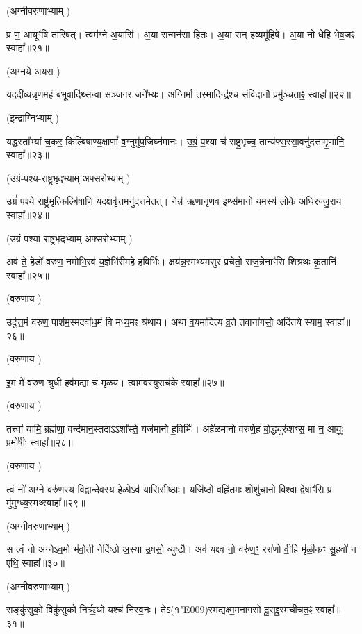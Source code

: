 (अग्नीवरुणाभ्याम् \idam)

प्र ण॒ आयूꣳ॑षि तारिषत्।
त्वम॑ग्ने अ॒यासि॑।
अ॒या सन्मन॑सा हि॒तः।
अ॒या सन् ह॒व्यमू॑हिषे।
अ॒या नो॑ धेहि भेष॒जꣴ स्वाहा᳚॥२१॥

(अग्नये अयस \idam)


यददी᳚व्यन्नृ॒णम॒हं ब॒भूवादि॑थ्सन्वा सञ्ज॒गर॒ जने᳚भ्यः। 
अ॒ग्निर्मा॒ तस्मा॒दिन्द्र॑श्च संविदा॒नौ प्रमु॑ञ्चता॒ꣴ॒ स्वाहा᳚॥२२॥

(इन्द्राग्निभ्याम् \idam)

यद्धस्ता᳚भ्यां च॒कर॒ किल्बि॑षाण्य॒क्षाणां᳚ व॒ग्नुमु॑प॒जिघ्न॑मानः। 
उ॒ग्रं॒ प॒श्या च॑ राष्ट्र॒भृच्च॒ तान्य॑फ्स॒रसा॒वनु॑दत्तामृ॒णानि॒ स्वाहा᳚॥२३॥

(उग्रं-पश्य-राष्ट्रभृद्भ्याम् अफ्सरोभ्याम् \idam)


उग्रं॑ पश्ये॒ राष्ट्र॑भृ॒त्किल्बि॑षाणि॒ यद॒क्षवृ॑त्त॒मनु॑दत्तमे॒तत्। 
नेन्न॑ ऋ॒णानृ॒णव॒ इथ्स॑मानो य॒मस्य॑ लो॒के अधि॑रज्जु॒राय॒ स्वाहा᳚॥२४॥

(उग्रं-पश्या राष्ट्रभृद्भ्याम् अफ्सरोभ्याम् \idam)


अव॑ ते॒ हेडो॑ वरुण॒ नमो॑\-भि॒रव॑ य॒ज्ञेभि॑रीमहे ह॒विर्भिः॑।
क्षय॑न्न॒स्मभ्य॑मसुर प्रचेतो॒ राज॒न्नेनाꣳ॑सि शिश्रथः कृ॒तानि॑ स्वाहा᳚॥२५॥

(वरुणाय \idam)


उदु॑त्त॒मं व॑रुण॒ पाश॑\-म॒स्मद\-वा॑ध॒मं वि म॑ध्य॒मꣴ श्र॑थाय।
अथा॑ व॒यमा॑दित्य व्र॒ते तवाना॑गसो॒ अदि॑तये स्याम॒ स्वाहा᳚॥२६॥

(वरुणाय \idam)


इ॒मं मे॑ वरुण श्रुधी॒ हव॑म॒द्या च॑ मृळय। त्वाम॑व॒स्युराच॑के॒ स्वाहा᳚॥२७॥

(वरुणाय \idam)

तत्त्वा॑ यामि॒ ब्रह्म॑णा॒ वन्द॑मान॒स्तदाऽऽशा᳚स्ते॒ यज॑मानो ह॒विर्भिः॑।
अहे॑ळमानो वरुणे॒ह बो॒द्ध्युरु॑शꣳस॒ मा न॒ आयुः॒ प्रमो॑षीः॒ स्वाहा᳚॥२८॥

(वरुणाय \idam)



त्वं नो॑ अग्ने॒ वरु॑णस्य वि॒द्वान्दे॒वस्य॒ हेळो\-ऽव॑ यासिसीष्ठाः।
यजि॑ष्ठो॒ वह्नि॑तमः॒ शोशु॑चानो॒ विश्वा॒ द्वेषाꣳ॑सि॒ प्र मु॑मुग्ध्य॒स्मथ्स्वाहा᳚॥२९॥

(अग्नीवरुणाभ्याम् \idam)



स त्वं नो॑ अग्ने\-ऽव॒मो भ॑वो॒ती नेदि॑ष्ठो अ॒स्या उ॒षसो॒ व्यु॑ष्टौ।
अव॑ यक्ष्व नो॒ वरु॑ण॒ꣳ॒ ररा॑णो वी॒हि मृ॑ळी॒कꣳ सु॒हवो॑ न एधि॒ स्वाहा᳚॥३०॥

(अग्नीवरुणाभ्याम् \idam)


सङ्कु॑सुको॒ विकु॑सुको निर्\mbox{}ऋ॒थो यश्च॑ निस्व॒नः। 
तेऽ(१\char"E009)स्मद्यक्ष्म॒मना॑\-गसो दू॒राद्दू॒रम॑चीचत॒ꣴ॒ स्वाहा᳚॥३१॥

